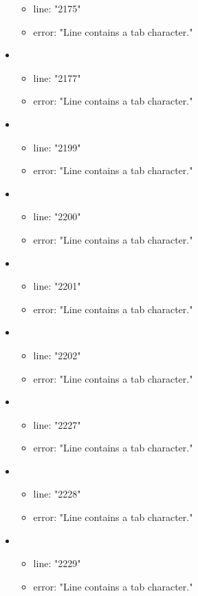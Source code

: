 \begin{itemize}
\begin{itemize}
		\item line: "2175" 
		\item error: "Line contains a tab character." 
	\end{itemize}
	\item 
	\begin{itemize} 
		\item line: "2177" 
		\item error: "Line contains a tab character." 
	\end{itemize}
	\item 
	\begin{itemize} 
		\item line: "2199" 
		\item error: "Line contains a tab character." 
	\end{itemize}
	\item 
	\begin{itemize} 
		\item line: "2200" 
		\item error: "Line contains a tab character." 
	\end{itemize}
	\item 
	\begin{itemize} 
		\item line: "2201" 
		\item error: "Line contains a tab character." 
	\end{itemize}
	\item 
	\begin{itemize} 
		\item line: "2202" 
		\item error: "Line contains a tab character." 
	\end{itemize}
	\item 
	\begin{itemize} 
		\item line: "2227" 
		\item error: "Line contains a tab character." 
	\end{itemize}
	\item 
	\begin{itemize} 
		\item line: "2228" 
		\item error: "Line contains a tab character." 
	\end{itemize}
	\item 
	\begin{itemize} 
		\item line: "2229" 
		\item error: "Line contains a tab character." 

\end{itemize}
\end{itemize}
